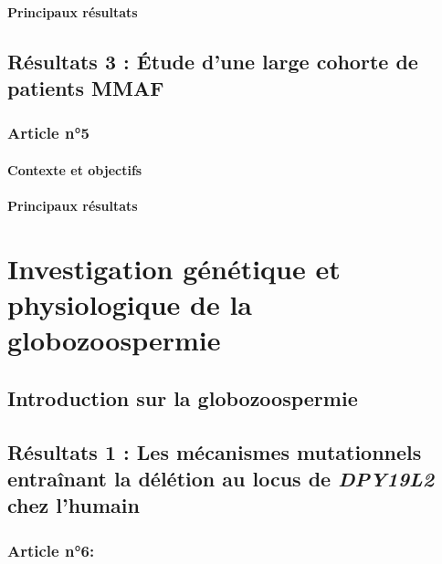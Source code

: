\documentclass[12pt,a4paper,twoside]{ugathesis}
\begin{document}
\subsubsection{Principaux résultats}\label{principaux-resultats-3}

\section{Résultats 3 : Étude d'une large cohorte de patients
MMAF}\label{resultats-3-etude-dune-large-cohorte-de-patients-mmaf}

\subsection{Article n°5}\label{article-n5}

\subsubsection{Contexte et objectifs}\label{contexte-et-objectifs-4}

\subsubsection{Principaux résultats}\label{principaux-resultats-4}

\chapter{Investigation génétique et physiologique de la
globozoospermie}\label{globo}

\section{Introduction sur la
globozoospermie}\label{introduction-sur-la-globozoospermie}

\section{\texorpdfstring{Résultats 1 : Les mécanismes mutationnels
entraînant la délétion au locus de \emph{DPY19L2} chez
l'humain}{Résultats 1 : Les mécanismes mutationnels entraînant la délétion au locus de DPY19L2 chez l'humain}}\label{mecamut}

\subsection{Article n°6:}\label{article-n6}
\end{document}
